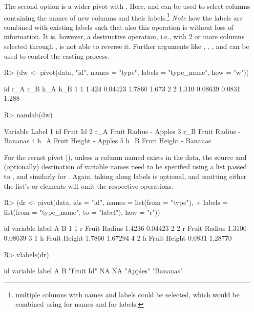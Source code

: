 \documentclass[article]{jss}
\newcommand{\fct}[1]{\code{#1()}}
\begin{document}
The second option is a wider pivot with . Here,  and  can be used to select columns containing the names of new columns and their labels.\footnote{multiple columns with names and labels could be selected, which would be combined using  for names and  for labels.} \emph{Note} how the labels are combined with existing labels such that also this operation is without loss of information. It is, however, a destructive operation, i.e., with 2 or more columns selected through , \fct{pivot} is not able to reverse it. Further arguments like , , , and  can be used to control the casting process.
%
\begin{Schunk}
\begin{Sinput}
R> (dw <- pivot(data, "id", names = "type", labels = "type_name", how = "w"))
\end{Sinput}
\begin{Soutput}
  id   r_A     r_B    h_A   h_B
1  1 1.424 0.04423 1.7860 1.673
2  2 1.310 0.08639 0.0831 1.288
\end{Soutput}
\begin{Sinput}
R> namlab(dw)
\end{Sinput}
\begin{Soutput}
  Variable                  Label
1       id               Fruit Id
2      r_A  Fruit Radius - Apples
3      r_B Fruit Radius - Bananas
4      h_A  Fruit Height - Apples
5      h_B Fruit Height - Bananas
\end{Soutput}
\end{Schunk}
%
For the recast pivot (), unless a column named  exists in the data, the source and (optionally) destination of variable names need to be specified using a list passed to , and similarly for . Again, taking along labels is optional, and omitting either the list's  or  elements will omit the respective operations.
%
\begin{Schunk}
\begin{Sinput}
R> (dr <- pivot(data, ids = "id", names = list(from = "type"),
+               labels = list(from = "type_name", to = "label"), how = "r"))
\end{Sinput}
\begin{Soutput}
  id variable        label      A       B
1  1        r Fruit Radius 1.4236 0.04423
2  2        r Fruit Radius 1.3100 0.08639
3  1        h Fruit Height 1.7860 1.67294
4  2        h Fruit Height 0.0831 1.28770
\end{Soutput}
\begin{Sinput}
R> vlabels(dr)
\end{Sinput}
\begin{Soutput}
        id   variable      label          A          B 
"Fruit Id"         NA         NA   "Apples"  "Bananas" 
\end{Soutput}
\end{Schunk}
\end{document}
